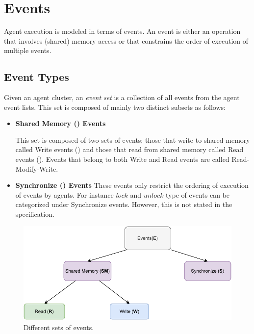\section{Events}
        
    Agent execution is modeled in terms of events. An event is either an operation that involves (shared) memory access or that constrains the order of execution of multiple events.

    \subsection{Event Types}
    
        Given an agent cluster, an \textit{event set}  is a collection of all events from the agent event lists. This set is composed of mainly two distinct subsets as follows: 

        \begin{itemize}
            \item \textbf{Shared Memory () Events}
                
                This set is composed of two sets of events; those that write to shared memory called Write events () and those that read from shared memory called Read events (). Events that belong to both Write and Read events are called Read-Modify-Write. 
            
            \item \textbf{Synchronize () Events} 
                These events only restrict the ordering of execution of events by agents. For instance $lock$ and $unlock$ type of events can be categorized under Synchronize events. However, this is not stated in the specification\footnotemark. 
    
        \end{itemize}
        
        \begin{figure}[H]
            \centering 
            \includegraphics[scale=0.7]{4.ECMAScriptMemoryModel/EventTypes.pdf}
            \caption{Different sets of events.}
        \end{figure}

